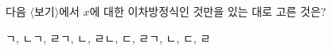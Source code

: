 다음 $\langle$보기$\rangle$에서 $x$에 대한 이차방정식인 것만을 있는 대로 고른 것은?
\begin{choices32}{ㄱ, ㄴ}{ㄱ, ㄹ}{ㄱ, ㄴ, ㄹ}{ㄴ, ㄷ, ㄹ}{ㄱ, ㄴ, ㄷ, ㄹ}\end{choices32}
